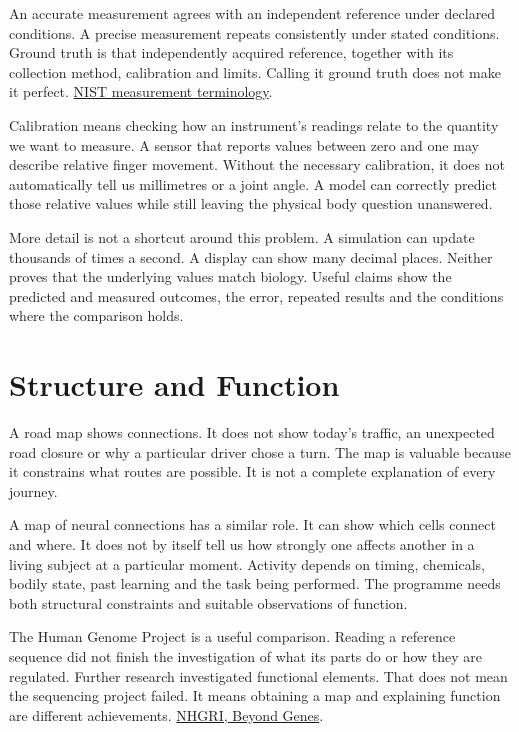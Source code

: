 An accurate measurement agrees with an independent reference under declared conditions. A precise measurement repeats consistently under stated conditions. Ground truth is that independently acquired reference, together with its collection method, calibration and limits. Calling it ground truth does not make it perfect. \href{https://www.nist.gov/pml/nist-technical-note-1297/nist-tn-1297-appendix-d1-terminology}{NIST measurement terminology}.\par

Calibration means checking how an instrument's readings relate to the quantity we want to measure. A sensor that reports values between zero and one may describe relative finger movement. Without the necessary calibration, it does not automatically tell us millimetres or a joint angle. A model can correctly predict those relative values while still leaving the physical body question unanswered.\par

More detail is not a shortcut around this problem. A simulation can update thousands of times a second. A display can show many decimal places. Neither proves that the underlying values match biology. Useful claims show the predicted and measured outcomes, the error, repeated results and the conditions where the comparison holds.\par

\section{Structure and Function}

A road map shows connections. It does not show today's traffic, an unexpected road closure or why a particular driver chose a turn. The map is valuable because it constrains what routes are possible. It is not a complete explanation of every journey.\par

A map of neural connections has a similar role. It can show which cells connect and where. It does not by itself tell us how strongly one affects another in a living subject at a particular moment. Activity depends on timing, chemicals, bodily state, past learning and the task being performed. The programme needs both structural constraints and suitable observations of function.\par

The Human Genome Project is a useful comparison. Reading a reference sequence did not finish the investigation of what its parts do or how they are regulated. Further research investigated functional elements. That does not mean the sequencing project failed. It means obtaining a map and explaining function are different achievements. \href{https://www.genome.gov/11009066/2003-release-scientists-venture-deeper-into-the-human-genome}{NHGRI, Beyond Genes}.\par


